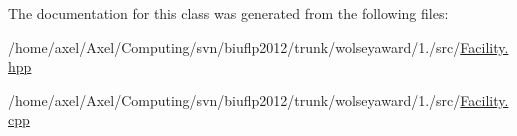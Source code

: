 \-The documentation for this class was generated from the following files\-:\begin{DoxyCompactItemize}
\item 
/home/axel/\-Axel/\-Computing/svn/biuflp2012/trunk/wolseyaward/1./src/\hyperlink{Facility_8hpp}{\-Facility.\-hpp}\item 
/home/axel/\-Axel/\-Computing/svn/biuflp2012/trunk/wolseyaward/1./src/\hyperlink{Facility_8cpp}{\-Facility.\-cpp}\end{DoxyCompactItemize}
